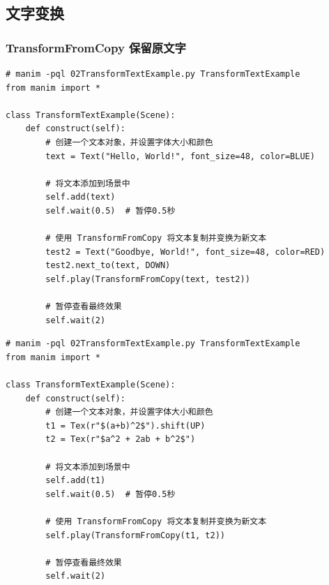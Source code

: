 \subsection{文字变换}
\label{subsubsec:manim_animation_transform_text}
\subsubsection{TransformFromCopy 保留原文字}
\label{subsubsec:manim_animation_transform_text_transformfromcopy}
\begin{lstlisting}[style=pythonstyle]
# manim -pql 02TransformTextExample.py TransformTextExample
from manim import *

class TransformTextExample(Scene):
    def construct(self):
        # 创建一个文本对象，并设置字体大小和颜色
        text = Text("Hello, World!", font_size=48, color=BLUE)

        # 将文本添加到场景中
        self.add(text)
        self.wait(0.5)  # 暂停0.5秒

        # 使用 TransformFromCopy 将文本复制并变换为新文本
        test2 = Text("Goodbye, World!", font_size=48, color=RED)
        test2.next_to(text, DOWN)
        self.play(TransformFromCopy(text, test2))

        # 暂停查看最终效果
        self.wait(2)
\end{lstlisting}

\begin{lstlisting}[style=pythonstyle]
# manim -pql 02TransformTextExample.py TransformTextExample
from manim import *

class TransformTextExample(Scene):
    def construct(self):
        # 创建一个文本对象，并设置字体大小和颜色
        t1 = Tex(r"$(a+b)^2$").shift(UP)
        t2 = Tex(r"$a^2 + 2ab + b^2$")

        # 将文本添加到场景中
        self.add(t1)
        self.wait(0.5)  # 暂停0.5秒

        # 使用 TransformFromCopy 将文本复制并变换为新文本
        self.play(TransformFromCopy(t1, t2))

        # 暂停查看最终效果
        self.wait(2)
\end{lstlisting}


